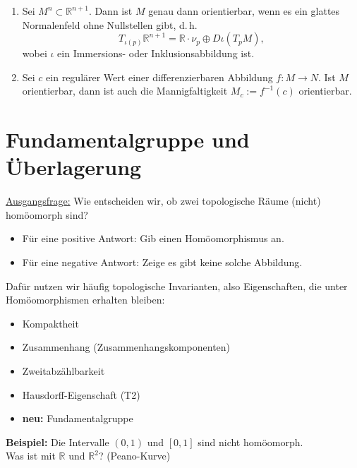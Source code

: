 \documentclass[fleqn, 12pt, letterpaper]{article}
\begin{document}
\begin{enumerate}[label=\roman*), resume]
    \item Sei \( M^n \subset \mathbb{R}^{n+1} \).  
    Dann ist \( M \) genau dann orientierbar, wenn es ein glattes Normalenfeld ohne Nullstellen gibt,  
    d.\,h.
    \[
    T_{\iota(p)} \mathbb{R}^{n+1} = \mathbb{R} \cdot \nu_p \oplus D\iota(T_p M),
    \]
    wobei \( \iota \) ein Immersions- oder Inklusionsabbildung ist.

    \item Sei \( c \) ein regulärer Wert einer differenzierbaren Abbildung \( f : M \to N \).  
    Ist \( M \) orientierbar, dann ist auch die Mannigfaltigkeit \( M_c := f^{-1}(c) \) orientierbar.
\end{enumerate}

\section{Fundamentalgruppe und Überlagerung}
\underline{Ausgangsfrage:} Wie entscheiden wir, ob zwei topologische Räume (nicht) homöomorph sind?

\begin{itemize}
  \item {Für eine positive Antwort:} Gib einen Homöomorphismus an.
  \item {Für eine negative Antwort:} Zeige es gibt keine solche Abbildung.
\end{itemize}

Dafür nutzen wir häufig topologische Invarianten, also Eigenschaften, die unter Homöomorphismen erhalten bleiben:

\begin{itemize}
  \item Kompaktheit
  \item Zusammenhang (Zusammenhangskomponenten)
  \item Zweitabzählbarkeit
  \item Hausdorff-Eigenschaft (T2)
  \item \textbf{neu:} Fundamentalgruppe
\end{itemize}

\textbf{Beispiel:} Die Intervalle \( (0,1) \) und \( [0,1] \) sind nicht homöomorph.\\

Was ist mit \( \mathbb{R} \) und \( \mathbb{R}^2 \)? (Peano-Kurve)\\
\end{document}
